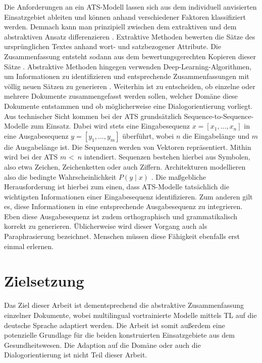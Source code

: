 \noindent
Die Anforderungen an ein \ac{ATS}-Modell lassen sich aus dem individuell anvisierten Einsatzgebiet ableiten und können anhand verschiedener Faktoren klassifiziert werden. Demnach kann man prinzipiell zwischen dem extraktiven und dem abstraktiven Ansatz differenzieren \cite[S.~5]{GAM16}. Extraktive Methoden bewerten die Sätze des ursprünglichen Textes anhand wort- und satzbezogener Attribute. Die Zusammenfassung entsteht sodann aus dem bewertungsgerechten Kopieren dieser Sätze \cite[S.~205-207]{KIA17}. Abstraktive Methoden hingegen verwenden Deep-Learning-Algorithmen, um Informationen zu identifizieren und entsprechende Zusammenfassungen mit völlig neuen Sätzen zu generieren \cite[S.~1]{NIT19}. Weiterhin ist zu entscheiden, ob einzelne oder mehrere Dokumente zusammengefasst werden sollen, welcher Domäne diese Dokumente entstammen und ob möglicherweise eine Dialogorientierung vorliegt.\\

\noindent
Aus technischer Sicht kommen bei der \ac{ATS} grundsätzlich Sequence-to-Sequence-Modelle zum Einsatz. Dabei wird stets eine Eingabesequenz $x = [x_{1}, ..., x_{n}]$ in eine Ausgabesequenz $y = [y_{1}, ..., y_{m}]$ überführt, wobei $n$ die Eingabelänge und $m$ die Ausgabelänge ist. Die Sequenzen werden von Vektoren repräsentiert. Mithin wird bei der \ac{ATS} $m$ \textless \, $n$ intendiert. Sequenzen bestehen hierbei aus Symbolen, also etwa Zeichen, Zeichenketten oder auch Ziffern. Architekturen modellieren also die bedingte Wahrscheinlichkeit $P(y \mid x)$ \cite[S.~32-33]{NIT19}. Die maßgebliche Herausforderung ist hierbei zum einen, dass \ac{ATS}-Modelle tatsächlich die wichtigsten Informationen einer Eingabesequenz identifizieren. Zum anderen gilt es, diese Informationen in eine entsprechende Ausgabesequenz zu integrieren. Eben diese Ausgabesequenz ist zudem orthographisch und grammatikalisch korrekt zu generieren. Üblicherweise wird dieser Vorgang auch als Paraphrasierung bezeichnet. Menschen müssen diese Fähigkeit ebenfalls erst einmal erlernen.


\section{Zielsetzung}
\noindent
Das Ziel dieser Arbeit ist dementsprechend die abstraktive Zusammenfassung einzelner Dokumente, wobei multilingual vortrainierte Modelle mittels \ac{TL} auf die deutsche Sprache adaptiert werden. Die Arbeit ist somit außerdem eine potenzielle Grundlage für die beiden konstruierten Einsatzgebiete aus dem Gesundheitswesen. Die Adaption auf die Domäne oder auch die Dialogorientierung ist nicht Teil dieser Arbeit.
\newpage

